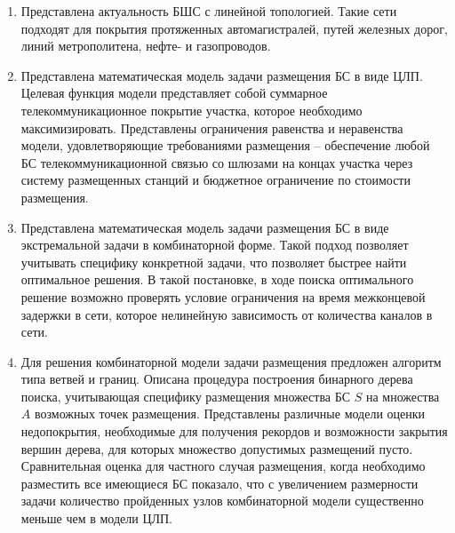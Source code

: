 \begin{enumerate}
  \item Представлена актуальность БШС с линейной топологией. Такие сети подходят для покрытия протяженных автомагистралей, путей железных дорог, линий метрополитена, нефте- и газопроводов.
  
  \item Представлена математическая модель задачи размещения БС в виде ЦЛП. Целевая функция модели представляет собой  суммарное телекоммуникационное покрытие участка, которое необходимо максимизировать. Представлены ограничения равенства и неравенства модели, удовлетворяющие требованиями размещения -- обеспечение любой БС телекоммуникационной связью со шлюзами на концах участка через систему размещенных станций и бюджетное ограничение по стоимости размещения.
  \item Представлена математическая модель задачи размещения БС в виде экстремальной задачи в комбинаторной форме. Такой подход позволяет учитывать специфику конкретной задачи, что позволяет быстрее найти оптимальное решения. В такой постановке, в ходе поиска оптимального решение возможно проверять условие ограничения на время межконцевой задержки в сети, которое нелинейную зависимость от количества каналов в сети.
  \item Для решения комбинаторной модели задачи размещения предложен алгоритм типа ветвей и границ. Описана процедура построения бинарного дерева поиска, учитывающая специфику размещения множества БС $S$ на множества $A$ возможных точек размещения. Представлены различные модели оценки недопокрытия, необходимые для получения рекордов и возможности закрытия вершин дерева, для которых множество допустимых размещений пусто. Сравнительная оценка для частного случая размещения, когда необходимо разместить все имеющиеся БС показало, что с увеличением размерности задачи количество пройденных узлов комбинаторной модели существенно меньше чем в модели ЦЛП. 

\end{enumerate}

